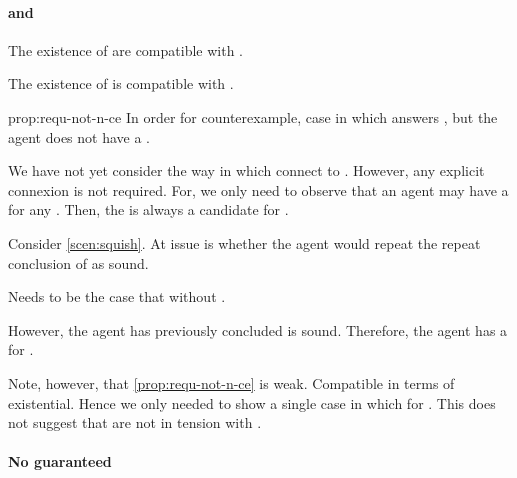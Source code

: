 \paragraph*{ and \issueConstraint{}}

\begin{note}
  The existence of  are compatible with \issueConstraint{}.
  \begin{proposition}
    \label{prop:requ-not-n-ce}
    The existence of  is compatible with \issueConstraint{}.
  \end{proposition}
  \begin{argument}{prop:requ-not-n-ce}
    In order for counterexample, case in which \ros{} answers \qWhyV{}, but the agent does not have a \wit{}.

    We have not yet consider the way in which  connect to \qWhyV{}.
    However, any explicit connexion is not required.
    For, we only need to observe that an agent may have a \wit{} for any \requ{}.
    Then, the \wit{} is always a candidate for \qHowV{}.

    Consider \autoref{scen:squish}.
    At issue is whether the agent would repeat the repeat conclusion of \sqE{} as sound.

    Needs to be the case that \ros{} without \wit{}.

    However, the agent has previously concluded \sqE{} is sound.
    Therefore, the agent has a \wit{} for \ros{}.
  \end{argument}

  Note, however, that \autoref{prop:requ-not-n-ce} is weak.
  Compatible in terms of existential.
  Hence we only needed to show a single case in which \wit{} for \requ{}.
  This does not suggest that  are not in tension with \issueConstraint{}.
\end{note}

\paragraph*{No guaranteed }

